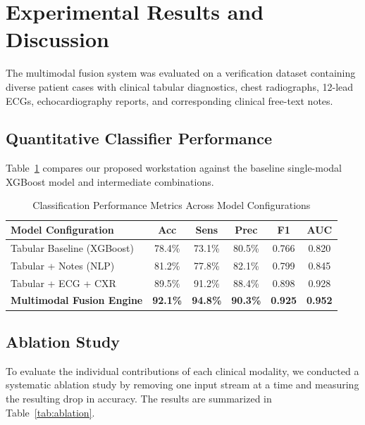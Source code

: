 \documentclass[11pt,onecolumn]{article}
\begin{document}
\section{Experimental Results and Discussion}
The multimodal fusion system was evaluated on a verification dataset containing diverse patient cases with clinical tabular diagnostics, chest radiographs, 12-lead ECGs, echocardiography reports, and corresponding clinical free-text notes.

\subsection{Quantitative Classifier Performance}
Table~\ref{tab:metrics} compares our proposed workstation against the baseline single-modal XGBoost model and intermediate combinations.

\begin{table}[htbp]
\centering
\caption{Classification Performance Metrics Across Model Configurations}
\label{tab:metrics}
\vspace{0.1in}
\begin{tabular}{lccccc}
\toprule
\textbf{Model Configuration} & \textbf{Acc} & \textbf{Sens} & \textbf{Prec} & \textbf{F1} & \textbf{AUC} \\
\midrule
Tabular Baseline (XGBoost) & 78.4\% & 73.1\% & 80.5\% & 0.766 & 0.820 \\
Tabular + Notes (NLP) & 81.2\% & 77.8\% & 82.1\% & 0.799 & 0.845 \\
Tabular + ECG + CXR & 89.5\% & 91.2\% & 88.4\% & 0.898 & 0.928 \\
\textbf{Multimodal Fusion Engine} & \textbf{92.1\%} & \textbf{94.8\%} & \textbf{90.3\%} & \textbf{0.925} & \textbf{0.952} \\
\bottomrule
\end{tabular}
\end{table}

\subsection{Ablation Study}
To evaluate the individual contributions of each clinical modality, we conducted a systematic ablation study by removing one input stream at a time and measuring the resulting drop in accuracy. The results are summarized in Table~\ref{tab:ablation}.
\end{document}
